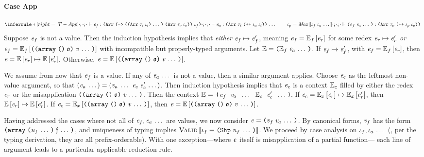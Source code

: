 \begin{sproof}
  \paragraph{Case {\sc App}}
  \[{\infr[T-App]
    {\typeof{\emptyEnv}{\emptyEnv}{\emptyEnv}{\expr_f}
      {\typearray
        {\typefun
          {\sequence{\typearray{\type_i}{\idx_i}}}
          {\typearray{\type_o}{\idx_o}}}
        {\idx_f}}
      \\\\
    \sequence{\typeof{\emptyEnv}{\emptyEnv}{\emptyEnv}
      {\expr_a}
      {\typearray{\type_i}{\idxappend{\idx_a \; \idx_i}}}}
    \qquad
    \idx_p = \mathit{Max}\llb \idx_f \; \sequence{\idx_a} \rrb}
    {\typeof{\emptyEnv}{\emptyEnv}{\emptyEnv}
      {\app{\expr_f}{\sequence{\expr_a}}}
      {\typearray{\type_o}{\idxappend{\idx_p \; \idx_o}}}}}\]
  Suppose $\mathit{e}_f$ is not a value.
  Then the induction hypothesis implies that
  \emph{either} $\mathit{e}_f \mapsto \mathit{e}_f'$,
  meaning $\mathit{e}_f = \mathbb{E}_f\left[\mathit{e}_r\right]$
  for some redex $\mathit{e}_r \mapsto \mathit{e}_r'$
  \emph{or} $\expr_f = \ctxt_f\left[\misapp\right]$
  with incompatible but properly-typed arguments.
  Let $\ctxt = \app{\ctxt_f}{\sequence{\expr_a}}$.
  If $\mathit{e}_f \mapsto \mathit{e}_f'$, with $\mathit{e}_f = \mathbb{E}_f\left[\mathit{e}_r\right]$,
  then $\mathit{e} = \mathbb{E}\left[\mathit{e}_r\right] \mapsto \mathbb{E}\left[\mathit{e}_r'\right]$.
  Otherwise, $\expr = \ctxt\left[\misapp\right]$.

  We assume from now that $\mathit{e}_f$ is a value.
  If any of $\mathit{e}_a \, \ldots \,$ is not a value,
  then a similar argument applies.
  Choose $\mathit{e}_c$ as the leftmost non-value argument,
  so that $\left( \mathit{e}_a \, \ldots \, \right) = \left( \mathit{v}_a \, \ldots \, \; \mathit{e}_c \; \mathit{e}_c' \, \ldots \, \right)$.
  Then induction hypothesis implies that $\mathit{e}_c$ is a context $\mathbb{E}_c$
  filled by either the redex $\mathit{e}_r$ or the misapplication $\misapp$.
  Then the context $\mathbb{E} =$
  {\tt ($\mathit{e}_f$ $\mathit{v}_a$ $\, \ldots \,$ $\mathbb{E}_c$ $\mathit{e}'_c$ $\, \ldots \,$)}.
  If $\mathit{e}_c = \mathbb{E}_x\left[\mathit{e}_r\right] \mapsto \mathbb{E}_x\left[\mathit{e}_r'\right]$,
  then $\mathbb{E}\left[\mathit{e}_r\right] \mapsto \mathbb{E}\left[\mathit{e}_r'\right]$.
  If $\expr_c = \ctxt_x\left[\misapp\right]$, then $\expr = \ctxt\left[\misapp\right]$.

  Having addressed the cases where not all of $\mathit{e}_f, \mathit{e}_a \, \ldots \,$ are values,
  we now consider $\expr = \app{\val_f}{\sequence{\val_a}}$.
  By canonical forms, $\mathit{v}_f$ has the form $\arrlit{\sequence{\func}}{\sequence{\nat_f}}$,
  and uniqueness of typing implies $\ieqv{\idx_f}{\idxshape{\sequence{\nat_f}}}$.
  We proceed by case analysis on $\mathit{\iota}_f, \mathit{\iota}_a \, \ldots \,$
  (\nb, per the typing derivation, they are all prefix-orderable).
  With one exception---where $\mathit{e}$ itself is misapplication of a partial function---%
  each line of argument leads to a particular applicable reduction rule.

\end{sproof}
